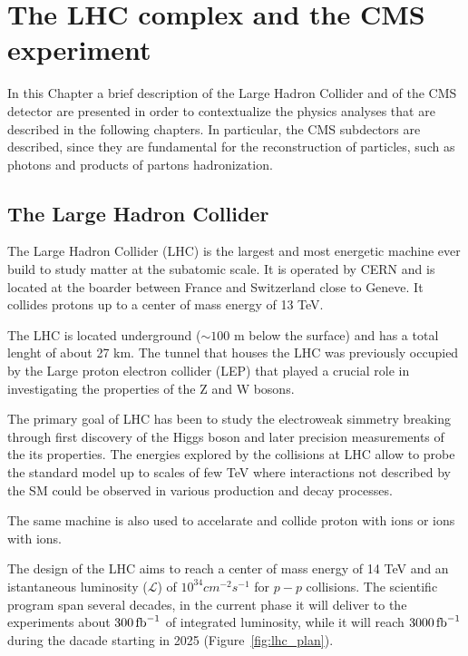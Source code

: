 \chapter{The LHC complex and the CMS experiment}
\label{chapter:cms}

In this Chapter a brief description of the Large Hadron Collider and of the CMS detector are
presented in order to contextualize the physics analyses that are described in the following chapters.
In particular, the CMS subdectors are described, since they are fundamental for the reconstruction of particles,
such as photons and products of partons hadronization.

\section{The Large Hadron Collider}

The Large Hadron Collider (LHC) is the largest and most energetic machine ever build to study
matter at the subatomic scale. It is operated by CERN and is located at the boarder between France and
Switzerland close to Geneve. It collides protons up to a center of mass energy of 13 TeV.

The LHC is located underground ($\sim 100$ m below the surface) and has a total lenght of about 27 km.
The tunnel that houses the LHC was previously occupied by the Large proton electron collider (LEP) that
played a crucial role in investigating the properties of the Z and W bosons.

The primary goal of LHC has been to study the electroweak simmetry breaking through first discovery of the Higgs boson and later
precision measurements of the its properties.
The energies explored by the collisions at LHC allow to probe the standard model up to scales of few TeV where
interactions not described by the SM could be observed in various production and decay processes.

The same machine is also used to accelarate and collide proton with ions or ions with ions.

The design of the LHC aims to reach a center of mass energy of 14 TeV and an istantaneous luminosity ($\mathcal{L}$)
of $10^{34}cm^{-2}s^{-1}$ for $p-p$ collisions. The scientific program span several decades, in the current phase it will
deliver to the experiments about $300 \mathrm{\,fb}^{-1}$ of integrated luminosity, while it will reach $3000 \mathrm{\,fb}^{-1}$ during the dacade
starting in 2025 (Figure~\ref{fig:lhc_plan}). 

